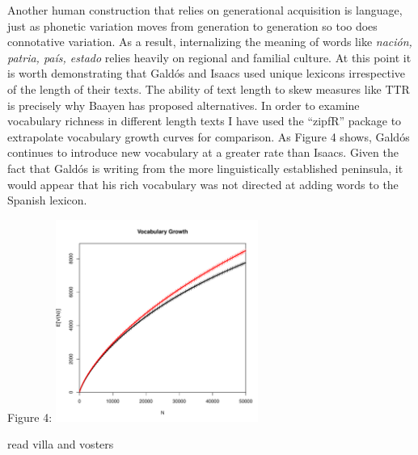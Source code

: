 \documentclass[12pt]{report}
\newenvironment{knitrout}{}{} %
\begin{document}
Another human construction that relies on generational acquisition is language, just as phonetic variation moves from generation to generation so too does connotative variation.
As a result, internalizing the meaning of words like \textit{nación, patria, país, estado} relies heavily on regional and familial culture. 
At this point it is worth demonstrating that Galdós and Isaacs used unique lexicons irrespective of the length of their texts.
The ability of text length to skew measures like TTR is precisely why Baayen has proposed alternatives.
In order to examine vocabulary richness in different length texts I have used the \enquote{zipfR} package to extrapolate vocabulary growth curves for comparison.
As Figure 4 shows, Galdós continues to introduce new vocabulary at a greater rate than Isaacs.
Given the fact that Galdós is writing from the more linguistically established peninsula, it would appear that his rich vocabulary was not directed at adding words to the Spanish lexicon. 

Figure 4:
\begin{knitrout}
\color{fgcolor}
\includegraphics[width=250,height=250]{figure/Vgc-1} 

\end{knitrout}

read villa and vosters
\end{document}
